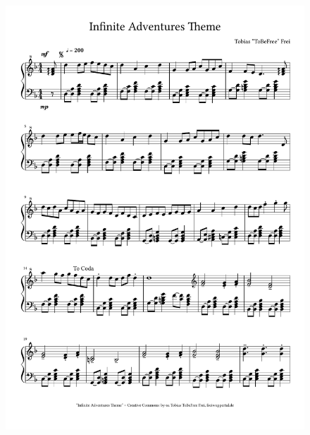 \begin{figure}[p]
    \includegraphics[width=\textwidth, page=1]{z-include-main-iatheme.pdf}
\end{figure}

